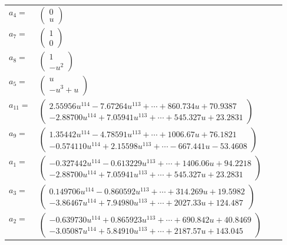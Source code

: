 \documentclass[1p]{elsarticle_modified}
\theoremstyle{definition}
\begin{document}
\begin{tabular}{m{7pt} m{180pt} m{7pt} m{180pt} }
\flushright $a_{4}=$&$\begin{pmatrix}0\\u\end{pmatrix}$ \\
\flushright $a_{7}=$&$\begin{pmatrix}1\\0\end{pmatrix}$ \\
\flushright $a_{8}=$&$\begin{pmatrix}1\\- u^2\end{pmatrix}$ \\
\flushright $a_{5}=$&$\begin{pmatrix}u\\- u^3+u\end{pmatrix}$ \\
\flushright $a_{11}=$&$\begin{pmatrix}2.55956 u^{114}-7.67264 u^{113}+\cdots+860.734 u+70.9387\\-2.88700 u^{114}+7.05941 u^{113}+\cdots+545.327 u+23.2831\end{pmatrix}$ \\
\flushright $a_{9}=$&$\begin{pmatrix}1.35442 u^{114}-4.78591 u^{113}+\cdots+1006.67 u+76.1821\\-0.574110 u^{114}+2.15598 u^{113}+\cdots-667.441 u-53.4608\end{pmatrix}$ \\
\flushright $a_{1}=$&$\begin{pmatrix}-0.327442 u^{114}-0.613229 u^{113}+\cdots+1406.06 u+94.2218\\-2.88700 u^{114}+7.05941 u^{113}+\cdots+545.327 u+23.2831\end{pmatrix}$ \\
\flushright $a_{3}=$&$\begin{pmatrix}0.149706 u^{114}-0.860592 u^{113}+\cdots+314.269 u+19.5982\\-3.86467 u^{114}+7.94980 u^{113}+\cdots+2027.33 u+124.487\end{pmatrix}$ \\
\flushright $a_{2}=$&$\begin{pmatrix}-0.639730 u^{114}+0.865923 u^{113}+\cdots+690.842 u+40.8469\\-3.05087 u^{114}+5.84910 u^{113}+\cdots+2187.57 u+143.045\end{pmatrix}$ \\

\end{tabular}
\end{document}
